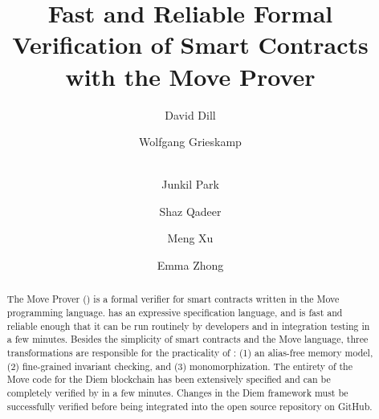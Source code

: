 \documentclass[runningheads]{llncs}
\begin{document}
\title{Fast and Reliable Formal Verification of Smart Contracts with the Move Prover}



\author{
  David Dill \and Wolfgang Grieskamp \and \\ Junkil
  Park \and Shaz Qadeer \and Meng Xu
  \and Emma Zhong
}


\maketitle
\begin{abstract}
  The Move Prover (\MVP) is a formal verifier for smart contracts
  written in the Move programming language. \MVP has an expressive
  specification language, and is fast and reliable enough that it can
  be run routinely by developers and in integration testing in a few
  minutes. Besides the simplicity of smart contracts and the Move
  language, three transformations are responsible for the practicality
  of \MVP: (1) an alias-free memory model, (2) fine-grained invariant
  checking, and (3) monomorphization.  The entirety of the Move code for
  the Diem blockchain has been extensively specified and can be
  completely verified by \MVP in a few minutes. Changes in the Diem
  framework must be successfully verified before being integrated into
  the open source repository on GitHub.
\end{abstract}











\appendix

\newpage
{}

\newpage

\end{document}
